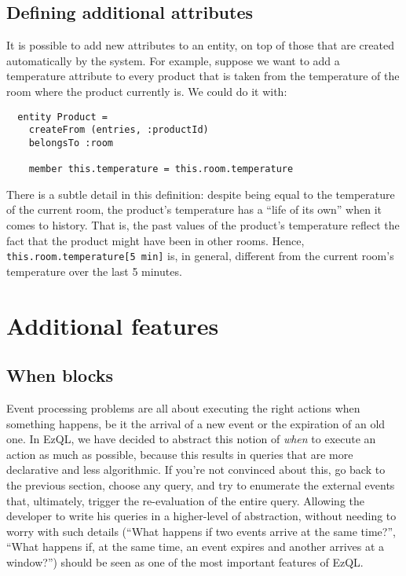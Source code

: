 \documentclass[a4,11pt]{report}
\begin{document}
\subsection{Defining additional attributes}

It is possible to add new attributes to an entity, on top of those
that are created automatically by the system. For example, suppose we
want to add a temperature attribute to every product that is taken
from the temperature of the room where the product currently is. We
could do it with:

\begin{lstlisting}
  entity Product =
    createFrom (entries, :productId)
    belongsTo :room

    member this.temperature = this.room.temperature

\end{lstlisting}

There is a subtle detail in this definition: despite being equal to
the temperature of the current room, the product's temperature has a
``life of its own'' when it comes to history. That is, the past values
of the product's temperature reflect the fact that the product might
have been in other rooms. Hence, \verb=this.room.temperature[5 min]=
is, in general, different from the current room's temperature over the
last 5 minutes.


\section{Additional features}

\subsection{When blocks}

Event processing problems are all about executing the right actions
when something happens, be it the arrival of a new event or the
expiration of an old one. In EzQL, we have decided to abstract this
notion of \emph{when} to execute an action as much as possible,
because this results in queries that are more declarative and less
algorithmic. If you're not convinced about this, go back to the
previous section, choose any query, and try to enumerate the external
events that, ultimately, trigger the re-evaluation of the entire
query. Allowing the developer to write his queries in a higher-level
of abstraction, without needing to worry with such details (``What
happens if two events arrive at the same time?'', ``What happens if,
at the same time, an event expires and another arrives at a window?'')
should be seen as one of the most important features of EzQL.
\end{document}
